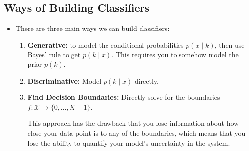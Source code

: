 \subsection{Ways of Building Classifiers}
\begin{itemize}
	\item There are three main ways we can build classifiers: 
		\begin{enumerate}[label=\arabic*.]
			\item \textbf{Generative:} to model the conditional probabilities \( p(x
				\mid k)\), then use Bayes' rule to get \( p(k \mid x) \). This
				requires you to somehow model the prior \( p(k) \). 
			\item \textbf{Discriminative:} Model \( p(k \mid x) \) directly. 
			\item \textbf{Find Decision Boundaries:} Directly solve for the
				boundaries \( f : \mathcal{X} \to \{0, \dots, K - 1\} \).  

				This approach has the drawback that you lose information about how
				close your data point is to any of the boundaries, which means that
				you lose the ability to quantify your model's uncertainty in the
				system.  
		\end{enumerate}
\end{itemize}

